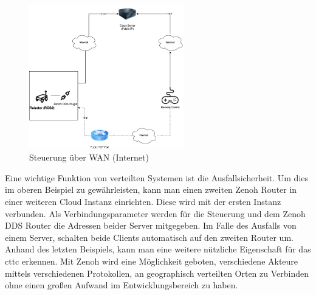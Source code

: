 \begin{figure}
  \begin{center}
    \includegraphics[width=0.6\textwidth]{figures/wan-steuerung.drawio.png}
  \end{center}
  \caption{Steuerung über WAN (Internet)}
  \label{fig:Steuerung über WAN (Internet)}
\end{figure}

Eine wichtige Funktion von verteilten Systemen ist die Ausfallsicherheit. Um dies im oberen Beispiel zu gewährleisten, kann man einen zweiten Zenoh Router in einer weiteren Cloud Instanz einrichten. Diese wird mit der ersten Instanz verbunden. Als Verbindungsparameter werden für die Steuerung und dem Zenoh DDS Router die Adressen beider Server mitgegeben. Im Falle des Ausfalls von einem Server, schalten beide Clients automatisch auf den zweiten Router um.\\
Anhand des letzten Beispiels, kann man eine weitere nützliche Eigenschaft für das \acrlong{cttc} erkennen. Mit Zenoh wird eine Möglichkeit geboten, verschiedene Akteure mittels verschiedenen Protokollen, an geographisch verteilten Orten zu Verbinden ohne einen großen Aufwand im Entwicklungsbereich zu haben.


